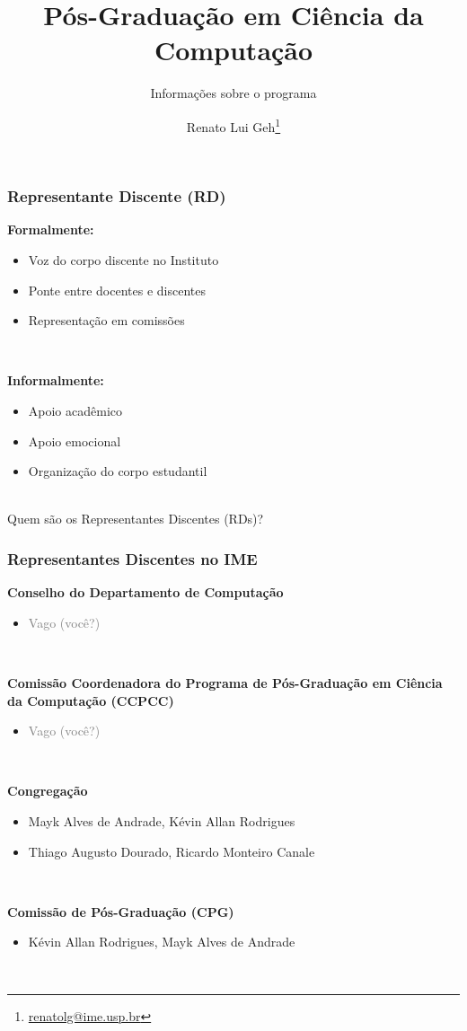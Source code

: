 \documentclass{beamer}
\title{\LARGE Pós-Graduação em Ciência da Computação}
\subtitle{\Large Informações sobre o programa}
\author{Renato Lui Geh\thanks{\url{renatolg@ime.usp.br}}}
\date{}
\begin{document}
\maketitle

\begin{frame}
  \frametitle{Representante Discente (RD)}

  \textbf{Formalmente:}
  \begin{itemize}
    \item Voz do corpo discente no Instituto
    \item Ponte entre docentes e discentes
    \item Representação em comissões
  \end{itemize}~\\\pause

  \textbf{Informalmente:}
  \begin{itemize}
    \item Apoio acadêmico
    \item Apoio emocional
    \item Organização do corpo estudantil
  \end{itemize}~\\

  Quem são os Representantes Discentes (RDs)?
\end{frame}

\begin{frame}
  \frametitle{Representantes Discentes no IME}

  \textbf{Conselho do Departamento de Computação}
  \begin{itemize}
    \item \textcolor{gray}{Vago (você?)}
  \end{itemize}~\\\pause

  \textbf{Comissão Coordenadora do Programa de Pós-Graduação em Ciência da Computação (CCPCC)}
  \begin{itemize}
    \item \textcolor{gray}{Vago (você?)}
  \end{itemize}~\\\pause

  \textbf{Congregação}
  \begin{itemize}
    \item Mayk Alves de Andrade, Kévin Allan Rodrigues
    \item Thiago Augusto Dourado, Ricardo Monteiro Canale
  \end{itemize}~\\\pause

  \textbf{Comissão de Pós-Graduação (CPG)}
  \begin{itemize}
    \item Kévin Allan Rodrigues, Mayk Alves de Andrade
  \end{itemize}~\\ 
\end{frame}
\end{document}
